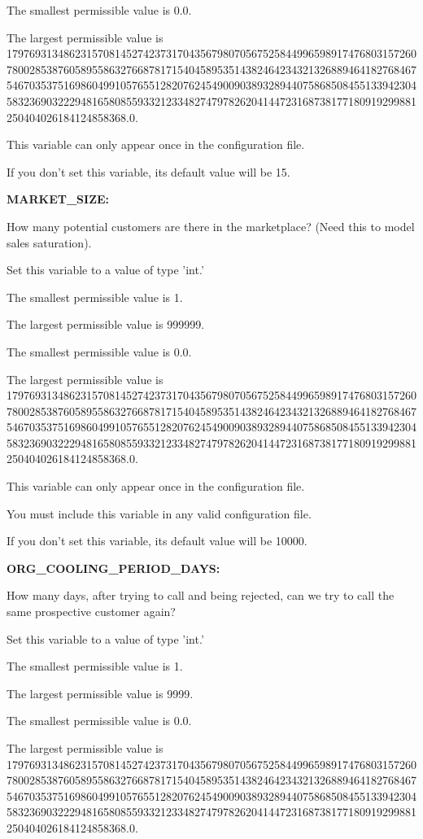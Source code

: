 The smallest permissible value is 0.0.

The largest permissible value is 179769313486231570814527423731704356798070567525844996598917476803157260780028538760589558632766878171540458953514382464234321326889464182768467546703537516986049910576551282076245490090389328944075868508455133942304583236903222948165808559332123348274797826204144723168738177180919299881250404026184124858368.0.

This variable can only appear once in the configuration file.

If you don't set this variable, its default value will be 15.


\textbf{MARKET\_SIZE:}


How many potential customers are there in the marketplace?  (Need this to model sales saturation).

Set this variable to a value of type 'int.'

The smallest permissible value is 1.

The largest permissible value is 999999.

The smallest permissible value is 0.0.

The largest permissible value is 179769313486231570814527423731704356798070567525844996598917476803157260780028538760589558632766878171540458953514382464234321326889464182768467546703537516986049910576551282076245490090389328944075868508455133942304583236903222948165808559332123348274797826204144723168738177180919299881250404026184124858368.0.

This variable can only appear once in the configuration file.

You must include  this variable in any valid configuration file.

If you don't set this variable, its default value will be 10000.


\textbf{ORG\_COOLING\_PERIOD\_DAYS:}


How many days, after trying to call and being rejected, can we try to call the same prospective customer again?

Set this variable to a value of type 'int.'

The smallest permissible value is 1.

The largest permissible value is 9999.

The smallest permissible value is 0.0.

The largest permissible value is 179769313486231570814527423731704356798070567525844996598917476803157260780028538760589558632766878171540458953514382464234321326889464182768467546703537516986049910576551282076245490090389328944075868508455133942304583236903222948165808559332123348274797826204144723168738177180919299881250404026184124858368.0.

